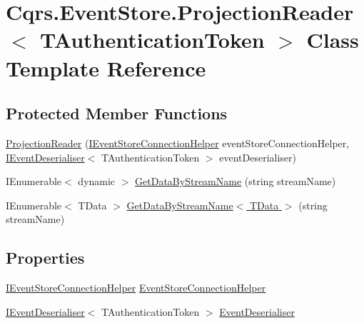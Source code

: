 \hypertarget{classCqrs_1_1EventStore_1_1ProjectionReader}{}\section{Cqrs.\+Event\+Store.\+Projection\+Reader$<$ T\+Authentication\+Token $>$ Class Template Reference}
\label{classCqrs_1_1EventStore_1_1ProjectionReader}
\subsection*{Protected Member Functions}
\begin{DoxyCompactItemize}
\item 
\hyperlink{classCqrs_1_1EventStore_1_1ProjectionReader_a87d5f996f75577bb6ae18704c9a590a2}{Projection\+Reader} (\hyperlink{interfaceCqrs_1_1EventStore_1_1IEventStoreConnectionHelper}{I\+Event\+Store\+Connection\+Helper} event\+Store\+Connection\+Helper, \hyperlink{interfaceCqrs_1_1EventStore_1_1IEventDeserialiser}{I\+Event\+Deserialiser}$<$ T\+Authentication\+Token $>$ event\+Deserialiser)
\item 
I\+Enumerable$<$ dynamic $>$ \hyperlink{classCqrs_1_1EventStore_1_1ProjectionReader_adcc229abde429acfa6b125b3a93a85b4}{Get\+Data\+By\+Stream\+Name} (string stream\+Name)
\item 
I\+Enumerable$<$ T\+Data $>$ \hyperlink{classCqrs_1_1EventStore_1_1ProjectionReader_adb256fc2c761a0add40c84fe2c1cb6e8}{Get\+Data\+By\+Stream\+Name$<$ T\+Data $>$} (string stream\+Name)
\end{DoxyCompactItemize}
\subsection*{Properties}
\begin{DoxyCompactItemize}
\item 
\hyperlink{interfaceCqrs_1_1EventStore_1_1IEventStoreConnectionHelper}{I\+Event\+Store\+Connection\+Helper} \hyperlink{classCqrs_1_1EventStore_1_1ProjectionReader_ab169b1404cc40751c3a71c772ed0eaa4}{Event\+Store\+Connection\+Helper}
\item 
\hyperlink{interfaceCqrs_1_1EventStore_1_1IEventDeserialiser}{I\+Event\+Deserialiser}$<$ T\+Authentication\+Token $>$ \hyperlink{classCqrs_1_1EventStore_1_1ProjectionReader_a2c7ada08a9525c161eb7e42e2dbf55e0}{Event\+Deserialiser}
\end{DoxyCompactItemize}


